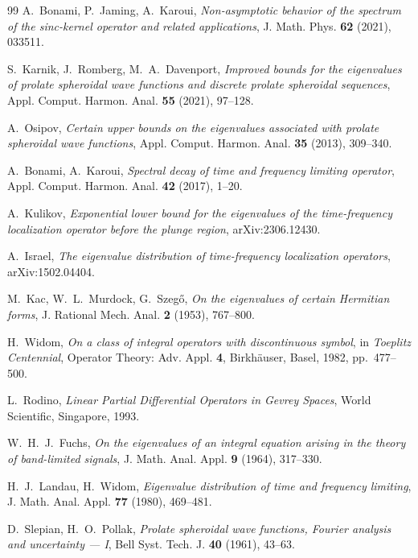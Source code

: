 \documentclass[11pt,a4paper]{article}
\begin{document}
\begin{thebibliography}{99}
A.~Bonami, P.~Jaming, A.~Karoui,
\emph{Non-asymptotic behavior of the spectrum of the sinc-kernel operator and
related applications}, J. Math. Phys. \textbf{62} (2021), 033511.

S.~Karnik, J.~Romberg, M.~A.~Davenport,
\emph{Improved bounds for the eigenvalues of prolate spheroidal wave functions
and discrete prolate spheroidal sequences},
Appl. Comput. Harmon. Anal. \textbf{55} (2021), 97--128.

A.~Osipov,
\emph{Certain upper bounds on the eigenvalues associated with prolate
spheroidal wave functions},
Appl. Comput. Harmon. Anal. \textbf{35} (2013), 309--340.

A.~Bonami, A.~Karoui,
\emph{Spectral decay of time and frequency limiting operator},
Appl. Comput. Harmon. Anal. \textbf{42} (2017), 1--20.

A.~Kulikov,
\emph{Exponential lower bound for the eigenvalues of the time-frequency
localization operator before the plunge region}, arXiv:2306.12430.

A.~Israel,
\emph{The eigenvalue distribution of time-frequency localization operators},
arXiv:1502.04404.

M.~Kac, W.~L.~Murdock, G.~Szeg\H{o},
\emph{On the eigenvalues of certain Hermitian forms},
J. Rational Mech. Anal. \textbf{2} (1953), 767--800.

H.~Widom,
\emph{On a class of integral operators with discontinuous symbol},
in \emph{Toeplitz Centennial}, Operator Theory: Adv. Appl. \textbf{4},
Birkh\"auser, Basel, 1982, pp.~477--500.

L.~Rodino,
\emph{Linear Partial Differential Operators in Gevrey Spaces},
World Scientific, Singapore, 1993.

W.~H.~J.~Fuchs,
\emph{On the eigenvalues of an integral equation arising in the theory of
band-limited signals}, J. Math. Anal. Appl. \textbf{9} (1964), 317--330.

H.~J.~Landau, H.~Widom,
\emph{Eigenvalue distribution of time and frequency limiting},
J. Math. Anal. Appl. \textbf{77} (1980), 469--481.

D.~Slepian, H.~O.~Pollak,
\emph{Prolate spheroidal wave functions, Fourier analysis and uncertainty --- I},
Bell Syst. Tech. J. \textbf{40} (1961), 43--63.


\end{thebibliography}
\end{document}
